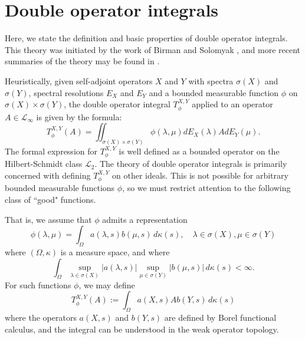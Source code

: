 \section{Double operator integrals}\label{doi} 
    Here, we state the definition and basic properties of double operator integrals. This theory was initiated by the work
    of Birman and Solomyak \cite{Birman-Solomyak-I,Birman-Solomyak-II,Birman-Solomyak-III}, and more recent summaries
    of the theory may be found in \cite{Birman-Solomyak-2003, Peller-doi-2016}.
    

    Heuristically, given self-adjoint operators $X$ and $Y$ with spectra $\sigma(X)$ and $\sigma(Y)$, spectral resolutions $E_X$ and $E_Y$ and a bounded measurable function $\phi$ on $\sigma(X)\times \sigma(Y)$, the double operator integral $T^{X,Y}_{\phi}$ 
    applied to an operator $A \in \mathcal{L}_{\infty}$ is given by the formula:
    $$T_{\phi}^{X,Y}(A)=\iint_{\sigma(X)\times \sigma(Y)} \phi(\lambda,\mu)dE_X(\lambda)AdE_Y(\mu).$$
    The formal expression for $T_{\phi}^{X,Y}$ is well defined as a bounded operator on the Hilbert-Schmidt class $\mathcal{L}_2$. The theory of double operator integrals is primarily concerned
    with defining $T_\phi^{X,Y}$ on other ideals.
    This is not possible for arbitrary bounded measurable functions $\phi$, so we must restrict attention to the following class of ``good" functions. 
    
    That is, we assume that $\phi$ admits a representation
    \begin{equation}\label{integral tensor product}
        \phi(\lambda,\mu) = \int_{\Omega} a(\lambda,s)b(\mu,s)\,d\kappa(s),\quad \lambda \in \sigma(X), \mu \in \sigma(Y)
    \end{equation}
    where $(\Omega,\kappa)$ is a measure space, and where
    \begin{equation}\label{doi sufficient condition}
        \int_{\Omega} \sup_{\lambda \in \sigma(X)}|a(\lambda,s)|\sup_{\mu \in \sigma(Y)} |b(\mu,s)|\,d\kappa(s) < \infty.
    \end{equation}
    For such functions $\phi$, we may define
    \begin{equation}\label{doi definition}
        T_{\phi}^{X,Y}(A) := \int_{\Omega} a(X,s)Ab(Y,s)\,d\kappa(s)
    \end{equation}
    where the operators $a(X,s)$ and $b(Y,s)$ are defined by Borel functional calculus, and the integral can be understood in the weak operator topology.
    
